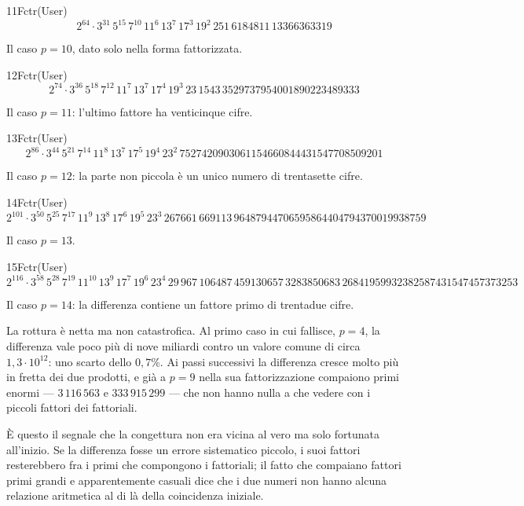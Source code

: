 \begin{espr}{11}{Fctr(User)}{}
\[
2^{64} \cdot 3^{31}\, 5^{15}\, 7^{10}\, 11^{6}\, 13^{7}\, 17^{3}\, 19^{2}\, 251\, 6184811\, 13366363319
\]
\end{espr}
Il caso $p=10$, dato solo nella forma fattorizzata.

\begin{espr}{12}{Fctr(User)}{}
\[
2^{74} \cdot 3^{36}\, 5^{18}\, 7^{12}\, 11^{7}\, 13^{7}\, 17^{4}\, 19^{3}\, 23\, 1543\, 3529737954001890223489333
\]
\end{espr}
Il caso $p=11$: l'ultimo fattore ha venticinque cifre.

\begin{espr}{13}{Fctr(User)}{}
\[
2^{86} \cdot 3^{44}\, 5^{21}\, 7^{14}\, 11^{8}\, 13^{7}\, 17^{5}\, 19^{4}\, 23^{2}\, 7527420903061154660844431547708509201
\]
\end{espr}
Il caso $p=12$: la parte non piccola è un unico numero di trentasette cifre.

\begin{espr}{14}{Fctr(User)}{}
\[
2^{101} \cdot 3^{50}\, 5^{25}\, 7^{17}\, 11^{9}\, 13^{8}\, 17^{6}\, 19^{5}\, 23^{3}\, 267661\, 669113\, 96487944706595864404794370019938759
\]
\end{espr}
Il caso $p=13$.

\begin{espr}{15}{Fctr(User)}{}
\[
2^{116} \cdot 3^{58}\, 5^{28}\, 7^{19}\, 11^{10}\, 13^{9}\, 17^{7}\, 19^{6}\, 23^{4}\, 29\, 967\, 106487\, 459130657\, 3283850683\, 26841959932382587431547457373253
\]
\end{espr}
Il caso $p=14$: la differenza contiene un fattore primo di trentadue cifre.


La rottura è netta ma non catastrofica. Al primo caso in cui fallisce, $p=4$, la differenza vale poco più di nove miliardi contro un valore comune di circa $1{,}3\cdot10^{12}$: uno scarto dello $0{,}7\%$. Ai passi successivi la differenza cresce molto più in fretta dei due prodotti, e già a $p=9$ nella sua fattorizzazione compaiono primi enormi — $3\,116\,563$ e $333\,915\,299$ — che non hanno nulla a che vedere con i piccoli fattori dei fattoriali.

È questo il segnale che la congettura non era vicina al vero ma solo fortunata all'inizio. Se la differenza fosse un errore sistematico piccolo, i suoi fattori resterebbero fra i primi che compongono i fattoriali; il fatto che compaiano fattori primi grandi e apparentemente casuali dice che i due numeri non hanno alcuna relazione aritmetica al di là della coincidenza iniziale.

